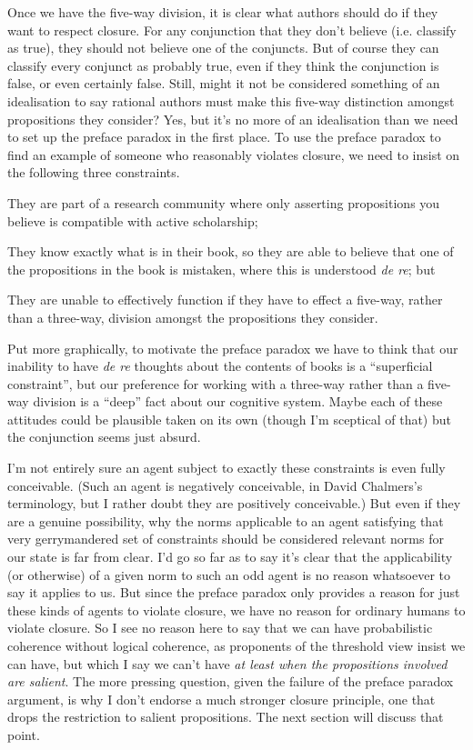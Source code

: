 Once we have the five-way division, it is clear what authors should do if they want to respect closure. For any conjunction that they don't believe (i.e. classify as true), they should not believe one of the conjuncts. But of course they can classify every conjunct as probably true, even if they think the conjunction is false, or even certainly false. Still, might it not be considered something of an idealisation to say rational authors must make this five-way distinction amongst propositions they consider? Yes, but it's no more of an idealisation than we need to set up the preface paradox in the first place. To use the preface paradox to find an example of someone who reasonably violates closure, we need to insist on the following three constraints.

\begin{enumerate*}
\renewcommand{\labelenumi}{\alph{enumi})}
\item They are part of a research community where only asserting propositions you believe is compatible with active scholarship;
\item They know exactly what is in their book, so they are able to believe that one of the propositions in the book is mistaken, where this is understood \textit{de re}; but
\item They are unable to effectively function if they have to effect a five-way, rather than a three-way, division amongst the propositions they consider.
\end{enumerate*}

\noindent Put more graphically, to motivate the preface paradox we have to think that our inability to have \textit{de re} thoughts about the contents of books is a ``superficial constraint'', but our preference for working with a three-way rather than a five-way division is a ``deep'' fact about our cognitive system. Maybe each of these attitudes could be plausible taken on its own (though I'm sceptical of that) but the conjunction seems just absurd.

I'm not entirely sure an agent subject to exactly these constraints is even fully conceivable. (Such an agent is negatively conceivable, in David Chalmers's terminology, but I rather doubt they are positively conceivable.) But even if they are a genuine possibility, why the norms applicable to an agent satisfying that very gerrymandered set of constraints should be considered relevant norms for our state is far from clear. I'd go so far as to say it's clear that the applicability (or otherwise) of a given norm to such an odd agent is no reason whatsoever to say it applies to us. But since the preface paradox only provides a reason for just these kinds of agents to violate closure, we have no reason for ordinary humans to violate closure. So I see no reason here to say that we can have probabilistic coherence without logical coherence, as proponents of the threshold view insist we can have, but which I say we can't have \textit{at least when the propositions involved are salient}. The more pressing question, given the failure of the preface paradox argument, is why I don't endorse a much stronger closure principle, one that drops the restriction to salient propositions. The next section will discuss that point.

